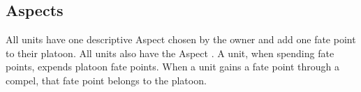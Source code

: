 \subsection{Aspects}
\label{sec:platoon-unit-aspects}

All units have one descriptive Aspect chosen by the owner and add one fate point to their platoon. All units also have the Aspect . A unit, when spending fate points, expends platoon fate points. When a unit gains a fate point through a compel, that fate point belongs to the platoon.

